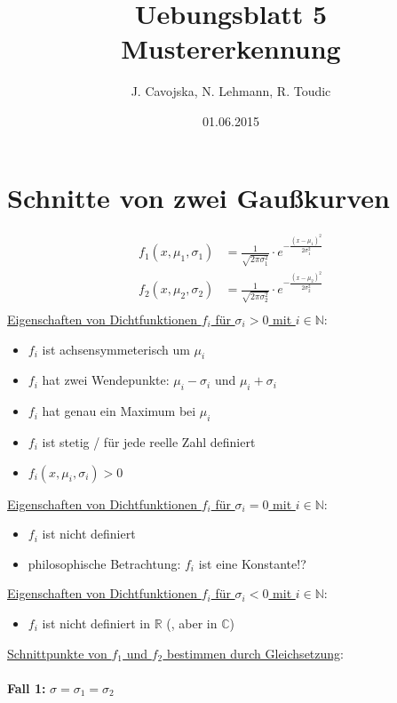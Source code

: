 \documentclass[12pt]{article}
\title{Uebungsblatt 5\\ \glqq Mustererkennung\grqq}
\author{J. Cavojska, N. Lehmann, R. Toudic}
\date{01.06.2015}
\begin{document}
\maketitle
\tableofcontents
\newpage

\section{Schnitte von zwei Gau\ss kurven}

\begin{align*}
f_1(x,\mu_1,\sigma_1) &= \frac{1}{\sqrt{2 \pi \sigma_1^2}} \cdot e^{-\frac{(x-\mu_1)^2}{2 \sigma_1^2}}\\
f_2(x,\mu_2,\sigma_2) &= \frac{1}{\sqrt{2 \pi \sigma_2^2}} \cdot e^{-\frac{(x-\mu_2)^2}{2 \sigma_2^2}}\\
\end{align*}
\underline{Eigenschaften von Dichtfunktionen $f_i$ f\"ur $\sigma_i > 0$ mit $i \in \mathbb{N}$}:
\begin{itemize}
\item $f_i$ ist achsensymmeterisch um $\mu_i$
\item $f_i$ hat zwei Wendepunkte: $\mu_i - \sigma_i$ und $\mu_i + \sigma_i$
\item $f_i$ hat genau ein Maximum bei $\mu_i$
\item $f_i$ ist stetig / f\"ur jede reelle Zahl definiert
\item $f_i(x,\mu_i,\sigma_i) > 0$
\end{itemize}
\underline{Eigenschaften von Dichtfunktionen $f_i$ f\"ur $\sigma_i = 0$ mit $i \in \mathbb{N}$}:
\begin{itemize}
\item $f_i$ ist nicht definiert
\item philosophische Betrachtung: $f_i$ ist eine Konstante!?
\end{itemize}
\underline{Eigenschaften von Dichtfunktionen $f_i$ f\"ur $\sigma_i < 0$ mit $i \in \mathbb{N}$}:
\begin{itemize}
\item $f_i$ ist nicht definiert in $\mathbb{R}$ (, aber in $\mathbb{C}$)
\end{itemize}
\newpage
\underline{Schnittpunkte von $f_1$ und $f_2$ bestimmen durch Gleichsetzung}:\\
\\
\textbf{Fall 1:} $\sigma = \sigma_1 = \sigma_2$\\
\end{document}
